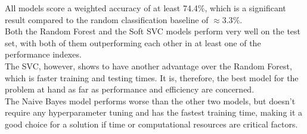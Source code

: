 \documentclass{article}
\begin{document}
All models score a weighted accuracy of at least 74.4\%, which is a significant result compared to the random classification baseline of $\approx 3.3\%$.\\
Both the Random Forest and the Soft SVC models perform very well on the test set, 
with both of them outperforming each other in at least one of the performance indexes.\\
The SVC, however, shows to have another advantage over the Random Forest, which is faster training and testing times. 
It is, therefore, the best model for the problem at hand as far as performance and efficiency are concerned.\\
The Naive Bayes model performs worse than the other two models,
but doesn't require any hyperparameter tuning and has the fastest training time, 
making it a good choice for a solution if time or computational resources are critical factors.\\






\end{document}
